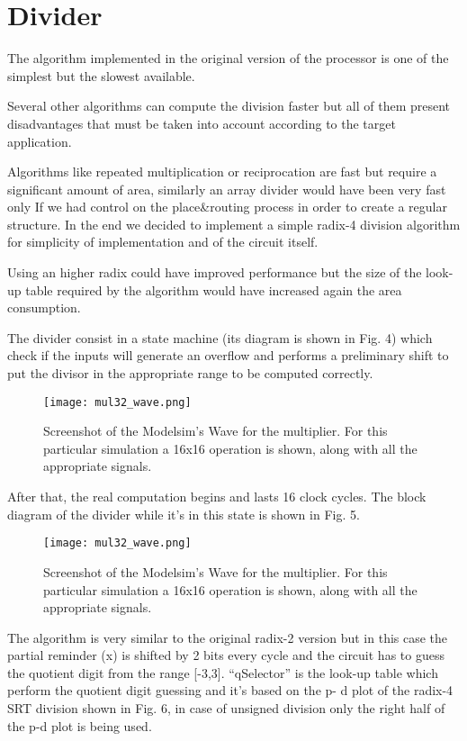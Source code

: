 \section{Divider}


The algorithm implemented in the original version of the processor is one of the simplest but the
slowest available.

Several other algorithms can compute the division faster but all of them present disadvantages
that must be taken into account according to the target application.

Algorithms like repeated multiplication or reciprocation are fast but require a significant amount
of area, similarly an array divider would have been very fast only If we had control on the
place\&routing process in order to create a regular structure. In the end we decided to implement
a simple radix-4 division algorithm for simplicity of implementation and of the circuit itself.

Using an higher radix could have improved performance but the size of the look-up table required
by the algorithm would have increased again the area consumption.

The divider consist in a state machine (its diagram is shown in Fig. 4) which check if the inputs will
generate an overflow and performs a preliminary shift to put the divisor in the appropriate range
to be computed correctly.


\begin{figure}[H]
\centering
\texttt{[image: mul32\_wave.png]}
\caption{Screenshot of the Modelsim's Wave for the multiplier. For this particular simulation a 16x16 operation is shown, along with all the appropriate signals.}
\label{fig:mul32_wave}
\end{figure}

After that, the real computation begins and lasts 16 clock cycles. The block diagram of the divider
while it's in this state is shown in Fig. 5.

\begin{figure}[H]
\centering
\texttt{[image: mul32\_wave.png]}
\caption{Screenshot of the Modelsim's Wave for the multiplier. For this particular simulation a 16x16 operation is shown, along with all the appropriate signals.}
\label{fig:mul32_wave}
\end{figure}

The algorithm is very similar to the original radix-2 version but in this case the partial reminder (x)
is shifted by 2 bits every cycle and the circuit has to guess the quotient digit from the range [-3,3].
``qSelector'' is the look-up table which perform the quotient digit guessing and it's based on the p-
d plot of the radix-4 SRT division shown in Fig. 6, in case of unsigned division only the right half of
the p-d plot is being used.

